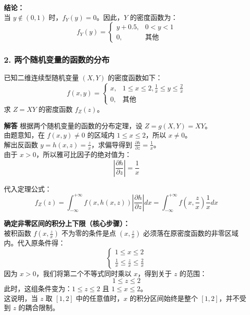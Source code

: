 \textbf{结论：}\\
当 $y \notin (0, 1)$ 时，$f_Y(y) = 0$。因此，$Y$ 的密度函数为：
$$ f_Y(y) = \begin{cases} y + 0.5, & 0 < y < 1 \\ 0, & \text{其他} \end{cases} $$


\vspace{1.5em}
\subsubsection*{2. 两个随机变量的函数的分布}

\begin{例题}[求 $Z=XY$ 的密度函数]
	已知二维连续型随机变量 $(X,Y)$ 的密度函数如下：
	$$ f(x,y) = \begin{cases} x, & 1 \le x \le 2, \frac{1}{x} \le y \le \frac{2}{x} \\ 0, & \text{其他} \end{cases} $$
	求 $Z=XY$ 的密度函数 $f_Z(z)$。
\end{例题}

\textbf{解答}\quad
根据两个随机变量的函数的分布定理，设 $Z = g(X,Y) = XY$。\\
由题意知，在 $f(x,y) \neq 0$ 的区域内 $1 \le x \le 2$，所以 $x \neq 0$。\\
解出反函数 $y = h(x,z) = \frac{z}{x}$，求偏导得到 $\frac{\partial h}{\partial z} = \frac{1}{x}$。\\
由于 $x > 0$，所以雅可比因子的绝对值为：
$$ \left| \frac{\partial h}{\partial z} \right| = \frac{1}{x} $$

代入定理公式：
$$ f_Z(z) = \int_{-\infty}^{+\infty} f(x, h(x,z)) \left| \frac{\partial h}{\partial z} \right| dx = \int_{-\infty}^{+\infty} f\left(x, \frac{z}{x}\right) \frac{1}{x} dx $$

\textbf{确定非零区间的积分上下限（核心步骤）：}\\
被积函数 $f\left(x, \frac{z}{x}\right)$ 不为零的条件是点 $\left(x, \frac{z}{x}\right)$ 必须落在原密度函数的非零区域内。代入原条件得：
$$ \begin{cases} 1 \le x \le 2 \\ \frac{1}{x} \le \frac{z}{x} \le \frac{2}{x} \end{cases} $$
因为 $x > 0$，我们将第二个不等式同时乘以 $x$，得到关于 $z$ 的范围：
$$ 1 \le z \le 2 $$
此时，这组条件变为：$1 \le z \le 2$ 且 $1 \le x \le 2$。\\
这说明，当 $z$ 取 $[1, 2]$ 中的任意值时，$x$ 的积分区间始终是整个 $[1, 2]$，并不受到 $z$ 的耦合限制。


